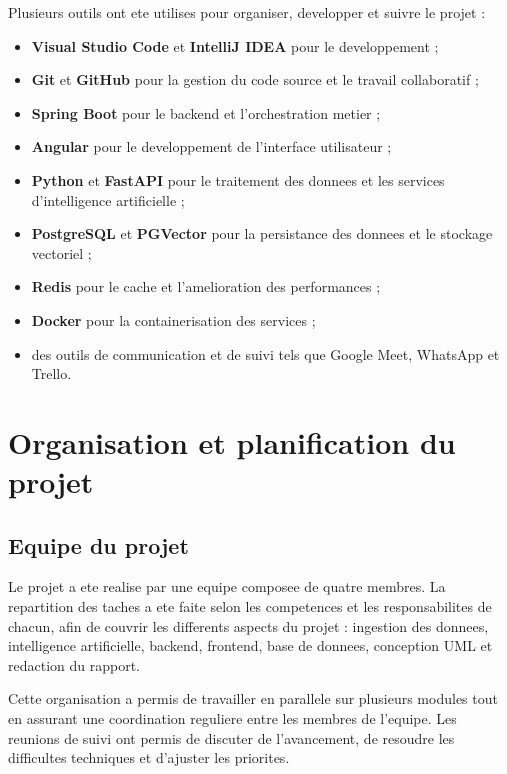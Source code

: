 Plusieurs outils ont ete utilises pour organiser, developper et suivre le projet :

\begin{itemize}
    \item \textbf{Visual Studio Code} et \textbf{IntelliJ IDEA} pour le developpement ;
    \item \textbf{Git} et \textbf{GitHub} pour la gestion du code source et le travail
    collaboratif ;
    \item \textbf{Spring Boot} pour le backend et l'orchestration metier ;
    \item \textbf{Angular} pour le developpement de l'interface utilisateur ;
    \item \textbf{Python} et \textbf{FastAPI} pour le traitement des donnees et les
    services d'intelligence artificielle ;
    \item \textbf{PostgreSQL} et \textbf{PGVector} pour la persistance des donnees et le
    stockage vectoriel ;
    \item \textbf{Redis} pour le cache et l'amelioration des performances ;
    \item \textbf{Docker} pour la containerisation des services ;
    \item des outils de communication et de suivi tels que Google Meet, WhatsApp et
    Trello.
\end{itemize}

\section{Organisation et planification du projet}

\subsection{Equipe du projet}

Le projet a ete realise par une equipe composee de quatre membres. La repartition des
taches a ete faite selon les competences et les responsabilites de chacun, afin de
couvrir les differents aspects du projet : ingestion des donnees, intelligence
artificielle, backend, frontend, base de donnees, conception UML et redaction du
rapport.

Cette organisation a permis de travailler en parallele sur plusieurs modules tout en
assurant une coordination reguliere entre les membres de l'equipe. Les reunions de
suivi ont permis de discuter de l'avancement, de resoudre les difficultes techniques
et d'ajuster les priorites.

